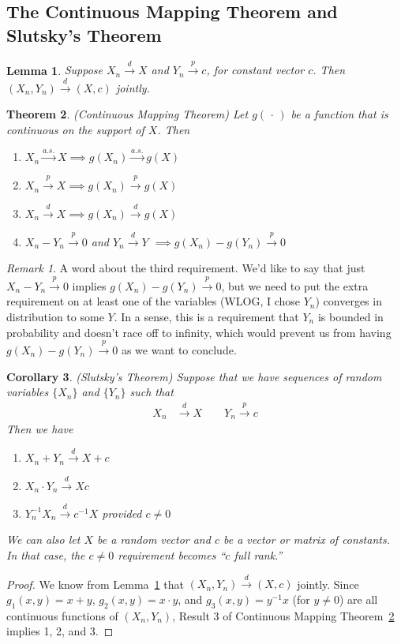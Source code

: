 \documentclass[12pt]{article}
\theoremstyle{plain}
\newtheorem{thm}{Theorem}[section]
\newtheorem{lem}[thm]{Lemma}
\newtheorem{cor}[thm]{Corollary}
\theoremstyle{definition}
\theoremstyle{remark}
\newtheorem*{rmk}{Remark}
\newcommand{\asto}{\xrightarrow{a.s.}}
\newcommand{\pto}{\xrightarrow{p}}
\newcommand{\dto}{\xrightarrow{d}}
\begin{document}
\clearpage
\subsection{The Continuous Mapping Theorem and Slutsky's Theorem}

\begin{lem}
\label{lem:joint}
Suppose $X_n\dto X$ and $Y_n\pto c$, for constant vector $c$.
Then $(X_n,Y_n)\dto (X,c)$ jointly.
\end{lem}

\begin{thm}\emph{(Continuous Mapping Theorem)}
\label{thm:cmt}
Let $g(\,\cdot\,)$ be a function that is continuous on the support of
$X$.  Then
\begin{enumerate}
  \item $X_n\asto X \implies g(X_n) \asto g(X)$
  \item $X_n\pto X \implies g(X_n) \pto g(X)$
  \item $X_n\dto X \implies g(X_n) \dto g(X)$
  \item $X_n - Y_n\pto 0$ and $Y_n \dto Y$
    $\implies g(X_n) - g(Y_n)\pto 0$
\end{enumerate}
\end{thm}
\begin{rmk}
A word about the third requirement. We'd like to say that just
$X_n - Y_n\pto 0$ implies $g(X_n) - g(Y_n)\pto 0$, but we need to put
the extra requirement on at least one of the variables (WLOG, I chose
$Y_n$) converges in distribution to some $Y$. In a sense, this is a
requirement that $Y_n$ is bounded in probability and doesn't race off to
infinity, which would prevent us from having $g(X_n)-g(Y_n) \pto 0$ as
we want to conclude.
\end{rmk}

\begin{cor}{\emph{(Slutsky's Theorem)}}
Suppose that we have sequences of random variables $\{X_n\}$ and
$\{Y_n\}$ such that
\begin{align*}
  X_n &\dto X
  \qquad
  Y_n \pto c
\end{align*}
Then we have
\begin{enumerate}
  \item $X_n+Y_n\dto X+c$
  \item $X_n\cdot Y_n\dto Xc$
  \item $Y_n^{-1}X_n\dto c^{-1}X$ provided $c\neq 0$
\end{enumerate}
We can also let $X$ be a random vector and $c$ be a vector or matrix of
constants. In that case, the $c\neq 0$ requirement becomes ``$c$ full
rank.''
\end{cor}
\begin{proof}
We know from Lemma~\ref{lem:joint} that $(X_n,Y_n)\dto (X,c)$ jointly.
Since $g_1(x,y) = x+y$, $g_2(x,y)=x\cdot y$, and $g_3(x,y)=y^{-1}x$
(for $y\neq 0$) are all continuous functions of $(X_n,Y_n)$, Result 3 of
Continuous Mapping Theorem~\ref{thm:cmt} implies 1, 2, and 3.
\end{proof}
\end{document}
